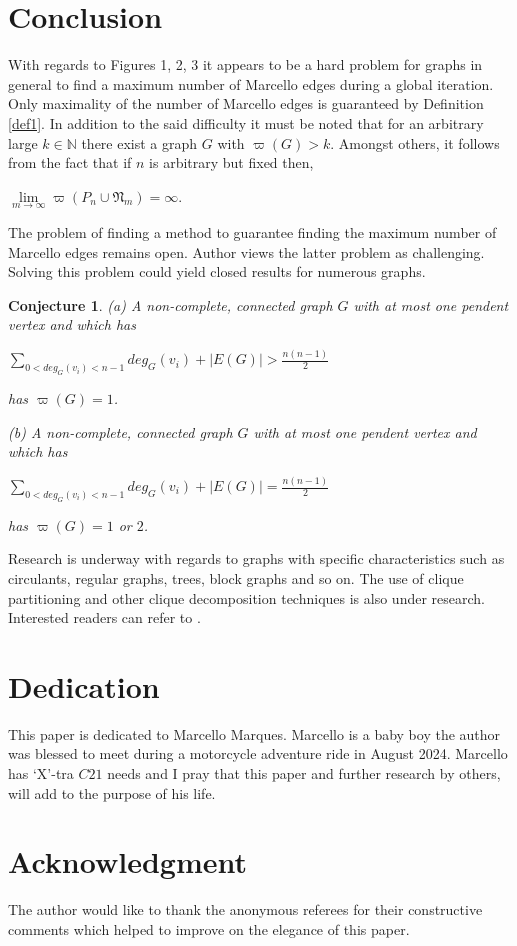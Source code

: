 \documentclass[12pt]{amsart}
\numberwithin{equation}{section}
\newtheorem{conjecture}[theorem]{Conjecture}
\numberwithin{equation}{section}
\begin{document}
\section{Conclusion}
With regards to Figures 1, 2, 3 it appears to be a hard problem for graphs in general to find a maximum number of Marcello edges during a global iteration. Only maximality of the number of Marcello edges is guaranteed by Definition \ref{def1}. In addition to the said difficulty it must be noted that for an arbitrary large $k \in \mathbb{N}$ there exist a graph $G$ with $\varpi(G) > k$. Amongst others, it follows from the fact that if $n$ is arbitrary but fixed then,
\begin{center}
$\lim\limits_{m\to \infty}\varpi(P_n\cup \mathfrak{N}_m) = \infty$.
\end{center} 
The problem of finding a method to guarantee finding the maximum number of Marcello edges remains open. Author views the latter problem as challenging. Solving this problem could yield closed results for numerous graphs.
\begin{conjecture} 

(a) A non-complete, connected graph $G$ with at most one pendent vertex and which has
\begin{center}
$\sum\limits_{0<deg_G(v_i) < n-1}deg_G(v_i) + |E(G)| > \frac{n(n-1)}{2}$
\end{center}
has $\varpi(G) = 1$.

(b) A non-complete, connected graph $G$ with at most one pendent vertex and which has
\begin{center}
$\sum\limits_{0<deg_G(v_i) < n-1}deg_G(v_i) + |E(G)| = \frac{n(n-1)}{2}$
\end{center}
has $\varpi(G) = 1$ or $2$.
\end{conjecture}
Research is underway with regards to graphs with specific characteristics such as circulants, regular graphs, trees, block graphs and so on. The use of clique partitioning and other clique decomposition techniques is also under research. Interested readers can refer to \cite{bhasker, cavers}.
\section*{Dedication}
This paper is dedicated to Marcello Marques. Marcello is a baby boy the author was blessed to meet during a motorcycle adventure ride in August 2024. Marcello has \lq X\rq-tra $C21$ needs and I pray that this paper and further research by others, will add to the purpose of his life.
\section*{Acknowledgment}
The author would like to thank the anonymous referees for their constructive comments which helped to improve on the elegance of this paper.
\end{document}
